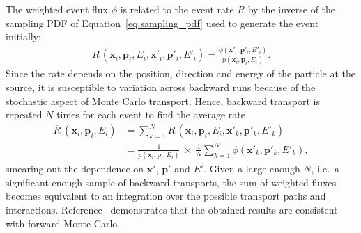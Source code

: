 The weighted event flux $\phi$ is related to the event rate $R$ by the
inverse of the sampling PDF of Equation~\ref{eq:sampling_pdf} used to generate
the event initially:
\begin{align}
R\,(\bm{x}_i, \bm{p}_i, E_i, \bm{x}'_i, \bm{p}'_i, E'_i) = 
    \frac{\phi(\bm{x}'_i, \bm{p}'_i, E'_i)}{p(\bm{x}_i, \bm{p}_i, E_i)}.
\end{align}
Since the rate depends on the position, direction and energy of the particle at
the source, it is susceptible to variation across backward runs because of the
stochastic aspect of Monte Carlo transport. Hence, backward transport is
repeated $N$ times for each event to find the average rate
\begin{align}\label{eq:avg_rate}
\overline{R}\:(\bm{x}_i, \bm{p}_i, E_i)
    &= \sum_{k=1}^N R\,(\bm{x}_i, \bm{p}_i, E_i, \bm{x}'_k, \bm{p}'_k, E'_k) \nonumber\\
    &= \frac{1}{p(\bm{x}_i, \bm{p}_i, E_i)} \ \times\ \frac{1}{N} \sum_{k=1}^N \phi(\bm{x}'_k, \bm{p}'_k, E'_k),
\end{align}
smearing out the dependence on $\bm{x}'$, $\bm{p}'$ and $E'$. Given a large
enough $N$, i.e.\ a significant enough sample of backward transports, the sum of
weighted fluxes becomes equivalent to an integration over the possible transport paths
and interactions. Reference~\cite{DESORGHER2010247} demonstrates that the
obtained results are consistent with forward Monte Carlo.












